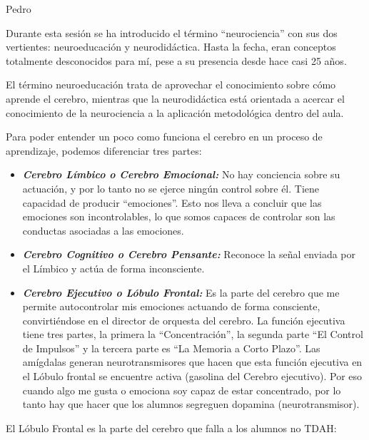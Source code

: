 \begin{opin}{\pedrocolor}{Pedro}


Durante esta sesión se ha introducido el término “neurociencia” con sus dos vertientes: neuroeducación y neurodidáctica.  Hasta la fecha, eran conceptos totalmente desconocidos para mí, pese a su presencia desde hace casi 25 años.

El término neuroeducación trata de aprovechar el conocimiento sobre cómo aprende el cerebro, mientras que la neurodidáctica está orientada a acercar el conocimiento de la neurociencia a la aplicación metodológica dentro del aula.

Para poder entender un poco como funciona el cerebro en un proceso de aprendizaje, podemos diferenciar tres partes:

\begin{itemize}

\item \textbf{\textit{Cerebro Límbico o Cerebro Emocional:}} No hay conciencia sobre su actuación, y por lo tanto no se ejerce ningún control sobre él. Tiene capacidad de producir “emociones”. Esto nos lleva a concluir que las emociones son incontrolables, lo que somos capaces de controlar son las conductas asociadas a las emociones.    

\item \textbf{\textit{Cerebro Cognitivo o Cerebro Pensante:}} Reconoce la señal enviada por el Límbico y actúa de forma inconsciente. 

\item \textbf{\textit{Cerebro Ejecutivo o Lóbulo Frontal:}} Es la parte del cerebro que me permite autocontrolar mis emociones actuando de forma consciente, convirtiéndose en el director de orquesta del cerebro.  La función ejecutiva tiene tres partes, la primera la “Concentración”, la segunda parte “El Control de Impulsos” y la tercera parte es “La Memoria a Corto Plazo”. Las amígdalas generan neurotransmisores que hacen que esta función ejecutiva en el Lóbulo frontal se encuentre activa (gasolina del Cerebro ejecutivo). Por eso cuando algo me gusta o emociona soy capaz de estar concentrado, por lo tanto hay que hacer que los alumnos segreguen dopamina (neurotransmisor). 

\end{itemize}

El Lóbulo Frontal es la parte del cerebro que falla a los alumnos no TDAH:

\begin{itemize}


\end{itemize}
\end{opin}

